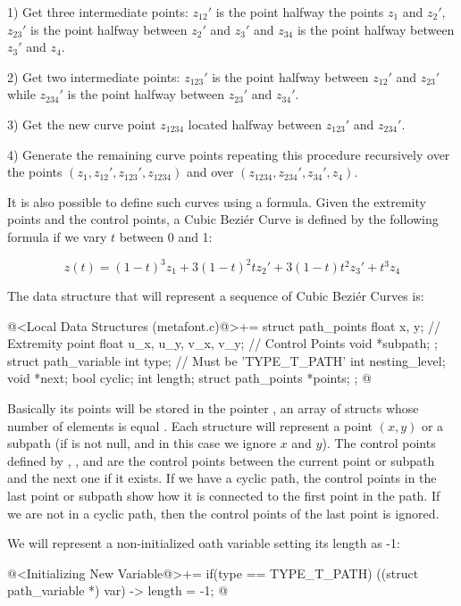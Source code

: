 1) Get three intermediate points: $z_{12}'$ is the point halfway the
points $z_1$ and $z_2'$, $z_{23}'$ is the point halfway between $z_2'$
and $z_3'$ and $z_{34}$ is the point halfway between $z_3'$ and $z_4$.

2) Get two intermediate points: $z_{123}'$ is the point halfway
between $z_{12}'$ and $z_{23}'$ while $z_{234}'$ is the point halfway
between $z_{23}'$ and $z_{34}'$.

3) Get the new curve point $z_{1234}$ located halfway between
$z_{123}'$ and $z_{234}'$.

4) Generate the remaining curve points repeating this procedure
recursively over the points $(z_1, z_{12}', z_{123}', z_{1234})$ and
over $(z_{1234}, z_{234}', z_{34}', z_4)$.

It is also possible to define such curves using a formula. Given the
extremity points and the control points, a Cubic Beziér Curve is
defined by the following formula if we vary $t$ between 0 and 1:

$$
z(t) = (1-t)^3z_1 + 3(1-t)^2tz_2' + 3(1-t)t^2z_3'+t^3z_4
$$

The data structure that will represent a sequence of Cubic Beziér
Curves is:

\iniciocodigo
@<Local Data Structures (metafont.c)@>+=
struct path_points{
  float x, y; // Extremity point
  float u_x, u_y, v_x, v_y;   // Control Points
  void *subpath;
};
struct path_variable{
  int type; // Must be 'TYPE_T_PATH'
  int nesting_level;
  void *next;
  bool cyclic;
  int length;
  struct path_points *points;
};
@
\fimcodigo

Basically its points will be stored in the
pointer , an array of structs whose number of
elements is equal . Each structure will represent a
point $(x, y)$ or a subpath (if  is not null, and
in this case we ignore $x$ and $y$). The control points defined
by , , 
and  are the control points between the current point
or subpath and the next one if it exists. If we have a cyclic path,
the control points in the last point or subpath show how it is
connected to the first point in the path. If we are not in a cyclic
path, then the control points of the last point is ignored.

We will represent a non-initialized oath variable setting its length
as -1:

\iniciocodigo
@<Initializing New Variable@>+=
if(type == TYPE_T_PATH){
  ((struct path_variable *) var) -> length = -1;
}
@
\fimcodigo

